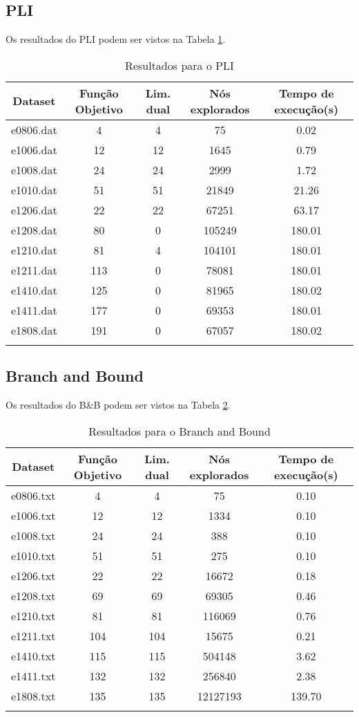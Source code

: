 \documentclass[a4paper,11pt]{article}
\begin{document}
\subsection{PLI}
Os resultados do PLI podem ser vistos na Tabela \ref{pli}.

\begin{longtable}{c c c c c}
  Dataset & Função Objetivo & Lim. dual & Nós explorados & Tempo de execução(s) \\
  \hline
  \endhead
  e0806.dat & 4   & 4  & 75     & 0.02   \\
  e1006.dat & 12  & 12 & 1645   & 0.79   \\
  e1008.dat & 24  & 24 & 2999   & 1.72   \\
  e1010.dat & 51  & 51 & 21849  & 21.26  \\
  e1206.dat & 22  & 22 & 67251  & 63.17  \\
  e1208.dat & 80  & 0  & 105249 & 180.01 \\
  e1210.dat & 81  & 4  & 104101 & 180.01 \\
  e1211.dat & 113 & 0  & 78081  & 180.01 \\
  e1410.dat & 125 & 0  & 81965  & 180.02 \\
  e1411.dat & 177 & 0  & 69353  & 180.01 \\
  e1808.dat & 191 & 0  & 67057  & 180.02 \\
  \caption{Resultados para o PLI}
  \label{pli}
\end{longtable}

\subsection{Branch and Bound}
Os resultados do B\&B podem ser vistos na Tabela \ref{bnb}.

\begin{longtable}{c c c c c}
  Dataset & Função Objetivo & Lim. dual & Nós explorados & Tempo de execução(s) \\
  \hline
  \endhead
  e0806.txt & 4   & 4   & 75       & 0.10 \\
  e1006.txt & 12  & 12  & 1334     & 0.10 \\
  e1008.txt & 24  & 24  & 388      & 0.10 \\
  e1010.txt & 51  & 51  & 275      & 0.10 \\
  e1206.txt & 22  & 22  & 16672    & 0.18 \\
  e1208.txt & 69  & 69  & 69305    & 0.46 \\
  e1210.txt & 81  & 81  & 116069   & 0.76 \\
  e1211.txt & 104 & 104 & 15675    & 0.21 \\
  e1410.txt & 115 & 115 & 504148   & 3.62 \\
  e1411.txt & 132 & 132 & 256840   & 2.38 \\
  e1808.txt & 135 & 135 & 12127193 & 139.70 \\
  \caption{Resultados para o Branch and Bound}
  \label{bnb}
\end{longtable}
\end{document}
